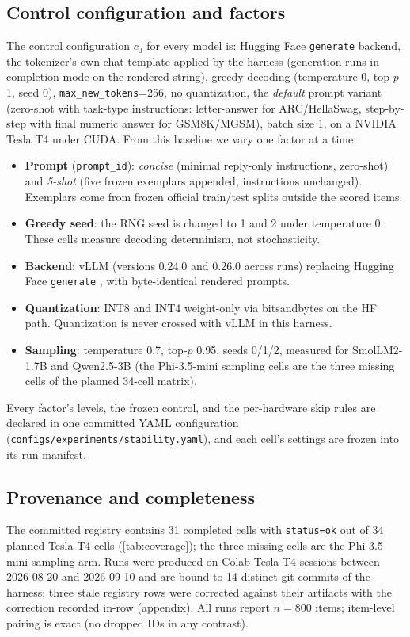 \subsection{Control configuration and factors}
\label{sec:factors}
The control configuration $c_0$ for every model is: Hugging Face
\texttt{generate} backend, the tokenizer's own chat template applied by the
harness (generation runs in completion mode on the rendered string), greedy
decoding (temperature 0, top-$p$ 1, seed 0), \texttt{max\_new\_tokens}=256,
no quantization, the \emph{default} prompt variant (zero-shot with
task-type instructions: letter-answer for ARC/HellaSwag, step-by-step with
final numeric answer for GSM8K/MGSM), batch size 1, on a NVIDIA Tesla T4
under CUDA. From this baseline we vary one factor at a time:
\begin{itemize}
  \item \textbf{Prompt} (\texttt{prompt\_id}): \emph{concise} (minimal
  reply-only instructions, zero-shot) and \emph{5-shot} (five frozen
  exemplars appended, instructions unchanged). Exemplars come from frozen
  official train/test splits outside the scored items.
  \item \textbf{Greedy seed}: the RNG seed is changed to 1 and 2 under
  temperature 0. These cells measure decoding determinism, not
  stochasticity.
  \item \textbf{Backend}: vLLM \citep{kwon2023efficient} (versions 0.24.0
  and 0.26.0 across runs) replacing Hugging Face \texttt{generate}
  \citep{biderman2024lessons}, with byte-identical rendered prompts.
  \item \textbf{Quantization}: INT8 and INT4 weight-only via bitsandbytes
  \citep{dettmers2022llm} on the HF path. Quantization is never crossed
  with vLLM in this harness.
  \item \textbf{Sampling}: temperature 0.7, top-$p$ 0.95, seeds 0/1/2,
  measured for SmolLM2-1.7B and Qwen2.5-3B (the Phi-3.5-mini sampling cells
  are the three missing cells of the planned 34-cell matrix).
\end{itemize}
Every factor's levels, the frozen control, and the per-hardware skip rules
are declared in one committed YAML configuration
(\texttt{configs/experiments/stability.yaml}), and each cell's settings are
frozen into its run manifest.

\subsection{Provenance and completeness}
The committed registry contains 31 completed cells with \texttt{status=ok}
out of 34 planned Tesla-T4 cells (\cref{tab:coverage}); the three missing
cells are the Phi-3.5-mini sampling arm. Runs were produced on Colab
Tesla-T4 sessions between 2026-08-20 and 2026-09-10 and are bound to 14
distinct git commits of the harness; three stale registry rows were corrected
against their artifacts with the correction recorded in-row (appendix).
All runs report $n=800$ items; item-level pairing is exact (no dropped IDs
in any contrast).

